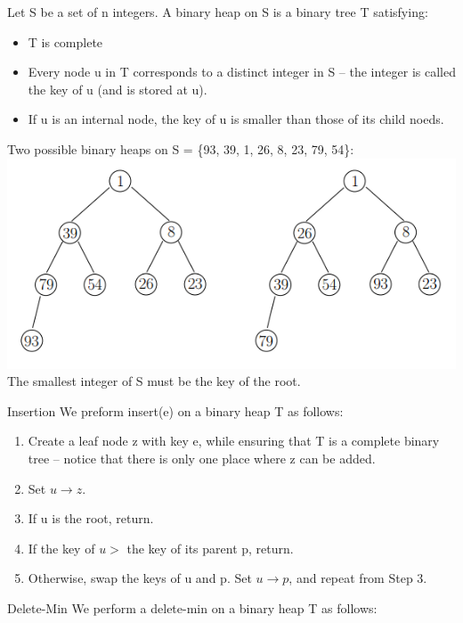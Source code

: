 \documentclass{lecture}
\begin{document}
\begin{landscape}
\begin{multicols}{2}
    \begin{note}{}
        Let S be a set of n integers. A binary heap on S is a binary tree T satisfying:
        \begin{itemize}[nolistsep]
            \item T is complete
            \item Every node u in T corresponds to a distinct integer in S -- the integer is called the key of u (and is stored at u).
            \item If u is an internal node, the key of u is smaller than those of its child noeds.
        \end{itemize}
        Two possible binary heaps on S = \{93, 39, 1, 26, 8, 23, 79, 54\}:
        \includegraphics[width=\linewidth]{binaryheap}
        The smallest integer of S must be the key of the root.
    \end{note}
    \vfill
    \begin{note}{Insertion}
        We preform insert(e) on a binary heap T as follows:
        \begin{enumerate}[nolistsep]
            \item Create a leaf node z with key e, while ensuring that T is a complete binary tree -- notice that there is only one place where z can be added.
            \item Set $u\rightarrow z$.
            \item If u is the root, return.
            \item If the key of $u >$ the key of its parent p, return.
            \item Otherwise, swap the keys of u and p. Set $u\rightarrow p$, and repeat from Step 3.
        \end{enumerate}
    \end{note}
    \vfill
    \begin{note}{Delete-Min}
        We perform a delete-min on a binary heap T as follows:

\end{note}
\end{multicols}
\end{landscape}
\end{document}
